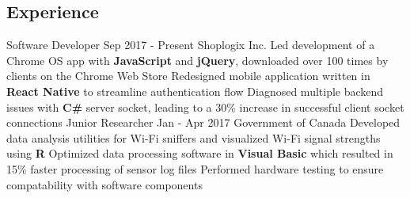 \documentclass[]{aanguyen_res}
\begin{document}
	\begin{main}%
		\vspace{35pt}%
		\section{Experience}
			\mainentry%
				{Software Developer}%
				{Sep 2017 - Present}%
				{Shoplogix Inc.}%
				{}%
				{\faCaretRight Led development of a Chrome OS app with \textbf{JavaScript} and \textbf{jQuery}, downloaded over 100 times by clients on the Chrome Web Store
				\faCaretRight Redesigned mobile application written in \textbf{React Native} to streamline authentication flow
				\faCaretRight Diagnosed multiple backend issues with \textbf{C\#} server socket, leading to a 30\% increase in successful client socket connections}
			\vspace{0.1cm}%
			\mainentry%
				{Junior Researcher}%
				{Jan - Apr 2017}%
				{Government of Canada}%
				{}%
				{\faCaretRight Developed data analysis utilities for Wi-Fi sniffers and visualized Wi-Fi signal strengths using \textbf{R}
				  \faCaretRight Optimized data processing software in \textbf{Visual Basic} which resulted in 15\% faster processing of sensor log files
				  \faCaretRight Performed hardware testing to ensure compatability with software components}
			\vspace{0.65cm}%

\end{main}
\end{document}
